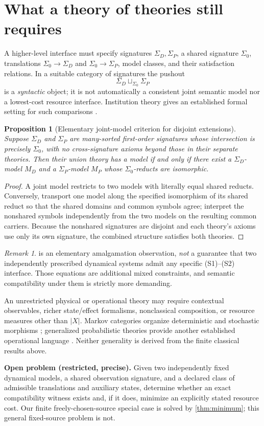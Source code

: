 \documentclass[11pt,letterpaper]{article}
\newtheorem{proposition}[theorem]{Proposition}
\theoremstyle{definition}\newtheorem{definition}[theorem]{Definition}
\theoremstyle{remark}\newtheorem{remark}[theorem]{Remark}
\begin{document}
\section{What a theory of theories still requires}
A higher-level interface must specify signatures $\Sigma_D,\Sigma_P$, a shared signature $\Sigma_0$, translations $\Sigma_0\to\Sigma_D$ and $\Sigma_0\to\Sigma_P$, model classes, and their satisfaction relations. In a suitable category of signatures the pushout
\[
\Sigma_D\sqcup_{\Sigma_0}\Sigma_P
\]
is a \emph{syntactic} object; it is not automatically a consistent joint semantic model nor a lowest-cost resource interface. Institution theory gives an established formal setting for such comparisons \cite{goguen1992}.
\begin{proposition}[Elementary joint-model criterion for disjoint extensions]\label{prop:joint}
Suppose $\Sigma_D$ and $\Sigma_P$ are many-sorted first-order signatures whose intersection is precisely $\Sigma_0$, with no cross-signature axioms beyond those in their separate theories. Then their union theory has a model if and only if there exist a $\Sigma_D$-model $M_D$ and a $\Sigma_P$-model $M_P$ whose $\Sigma_0$-reducts are isomorphic.
\end{proposition}
\begin{proof}
A joint model restricts to two models with literally equal shared reducts. Conversely, transport one model along the specified isomorphism of its shared reduct so that the shared domains and common symbols agree; interpret the nonshared symbols independently from the two models on the resulting common carriers. Because the nonshared signatures are disjoint and each theory's axioms use only its own signature, the combined structure satisfies both theories.
\end{proof}
\begin{remark}
 is an elementary amalgamation observation, \emph{not} a guarantee that two independently prescribed dynamical systems admit any specific (S1)--(S2) interface. Those equations are additional mixed constraints, and semantic compatibility under them is strictly more demanding.
\end{remark}
An unrestricted physical or operational theory may require contextual observables, richer state/effect formalisms, nonclassical composition, or resource measures other than $|X|$. Markov categories organize deterministic and stochastic morphisms \cite{fritz2020}; generalized probabilistic theories provide another established operational language \cite{barrett2007}. Neither generality is derived from the finite classical results above.
\begin{mainbox}
\textbf{Open problem (restricted, precise).} Given two independently fixed dynamical models, a shared observation signature, and a declared class of admissible translations and auxiliary states, determine whether an exact compatibility witness exists and, if it does, minimize an explicitly stated resource cost. Our finite freely-chosen-source special case is solved by \cref{thm:minimum}; this general fixed-source problem is not.
\end{mainbox}
\end{document}

